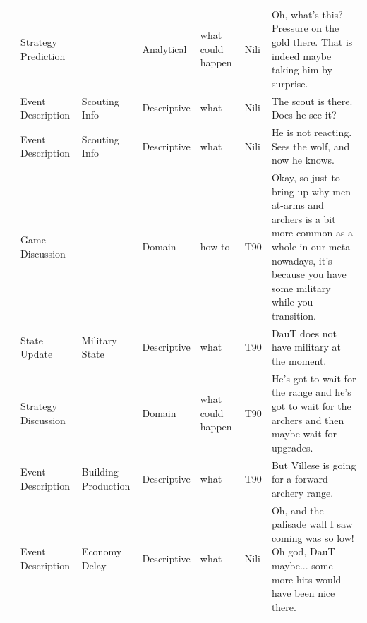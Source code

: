 {\begin{longtable}{@{}>{\theAppRow}r|L{2.3cm}L{2.2cm}L{1.4cm}L{2.2cm}L{0.5cm}U{5.6cm}@{}}
    & Strategy Prediction   &                      & Analytical  & what could happen & Nili    & Oh, what's this? Pressure on the gold there. That is indeed maybe taking him by surprise.                                                                                                                                \\
    & Event Description     & Scouting Info        & Descriptive   & what              & Nili    & The scout is there. Does he see it?                                                                                                                                                                                      \\
    & Event Description     & Scouting Info        & Descriptive   & what              & Nili    & He is not reacting. Sees the wolf, and now he knows.                                                                                                                                                                     \\
    & Game Discussion       &                      & Domain      & how to            & T90     & Okay, so just to bring up why men-at-arms and archers is a bit more common as a whole in our meta nowadays, it's because you have some military while you transition.                                                    \\
    & State Update          & Military State       & Descriptive   & what              & T90     & DauT does not have military at the moment.                                                                                                                                                                               \\
    & Strategy Discussion       &                      & Domain      & what could happen & T90     & He's got to wait for the range and he's got to wait for the archers and then maybe wait for upgrades.                                                                                                                    \\
    & Event Description     & Building Production  & Descriptive   & what              & T90     & But Villese is going for a forward archery range.                                                                                                                                                                         \\
    & Event Description     & Economy Delay        & Descriptive   & what              & Nili    & Oh, and the palisade wall I saw coming was so low! Oh god, DauT maybe... some more hits would have been nice there.                                                                                                      \\

\end{longtable}}
